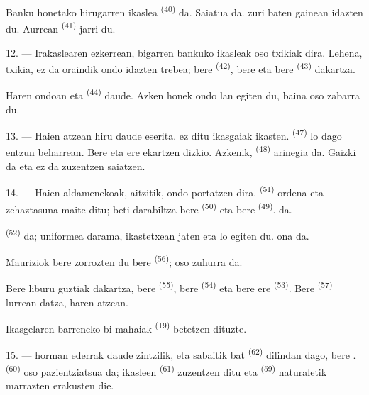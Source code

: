 Banku honetako hirugarren ikaslea  \textsuperscript{(40)} da.
Saiatua da.  zuri baten gainean idazten du. Aurrean
 \textsuperscript{(41)} jarri du.

12. --- Irakaslearen ezkerrean, bigarren bankuko ikasleak oso txikiak dira.
Lehena,  txikia, ez da oraindik ondo idazten trebea; bere
 \textsuperscript{(42)}, bere  eta bere
 \textsuperscript{(43)} dakartza.

Haren ondoan  eta  \textsuperscript{(44)} daude.
Azken honek ondo lan egiten du, baina  oso zabarra du.

13. --- Haien atzean hiru  daude eserita.  ez ditu
ikasgaiak ikasten.  \textsuperscript{(47)} lo dago entzun
beharrean. Bere   eta  ere
ekartzen dizkio. Azkenik,  \textsuperscript{(48)} arinegia da.
Gaizki  da eta ez da zuzentzen saiatzen.

14. --- Haien aldamenekoak, aitzitik, ondo portatzen dira. 
\textsuperscript{(51)} ordena eta zehaztasuna maite ditu; beti darabiltza bere
 \textsuperscript{(50)} eta bere 
\textsuperscript{(49)}.  da.

 \textsuperscript{(52)}  da; uniformea
darama, ikastetxean jaten eta lo egiten du.  ona da.

Mauriziok bere  zorrozten du bere 
\textsuperscript{(56)}; oso zuhurra da.

Bere liburu guztiak dakartza, bere  \textsuperscript{(55)},
bere  \textsuperscript{(54)} eta bere 
ere \textsuperscript{(53)}. Bere  \textsuperscript{(57)} lurrean
datza, haren atzean.

Ikasgelaren barreneko bi mahaiak  \textsuperscript{(19)}
betetzen dituzte.

\VUsaut{4.6mm}
\VUsaut{3.4mm}

15. ---  horman  ederrak daude zintzilik,
eta sabaitik  bat \textsuperscript{(62)} dilindan dago, bere
.  \textsuperscript{(60)} oso
pazientziatsua da; ikasleen  \textsuperscript{(61)} zuzentzen
ditu eta  \textsuperscript{(59)} naturaletik marrazten erakusten
die.

